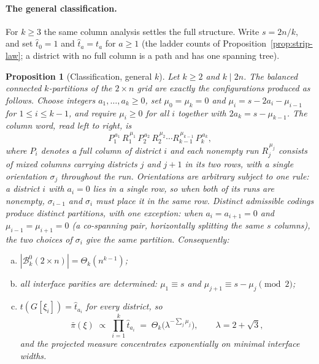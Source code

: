 \documentclass[11pt]{article}
\newcommand{\Bcal}{\mathcal{B}}
\newtheorem{proposition}[theorem]{Proposition}
\begin{document}
\paragraph{The general classification.} For $k \ge 3$ the same column
analysis settles the full structure. Write $s = 2n/k$, and set
$\hat t_0 = 1$ and $\hat t_a = t_a$ for $a \ge 1$ (the ladder counts of
Proposition~\ref{prop:strip-law}; a district with no full column is a
path and has one spanning tree).

\begin{proposition}[Classification, general $k$]
\label{prop:strip-classify-k}
Let $k \ge 2$ and $k \mid 2n$. The balanced connected $k$-partitions of
the $2 \times n$ grid are exactly the configurations produced as follows.
Choose integers $a_1, \ldots, a_k \ge 0$, set $\mu_0 = \mu_k = 0$ and
$\mu_i = s - 2a_i - \mu_{i-1}$ for $1 \le i \le k-1$, and require
$\mu_i \ge 0$ for all $i$ together with $2a_k = s - \mu_{k-1}$. The
column word, read left to right, is
\[
  P_1^{\,a_1}\, R_1^{\,\mu_1}\, P_2^{\,a_2}\, R_2^{\,\mu_2} \cdots
  R_{k-1}^{\,\mu_{k-1}}\, P_k^{\,a_k},
\]
where $P_i$ denotes a full column of district $i$ and each nonempty run
$R_j^{\,\mu_j}$ consists of mixed columns carrying districts $j$ and
$j+1$ in its two rows, with a single orientation $\sigma_j$ throughout
the run. Orientations are arbitrary subject to one rule: a district $i$
with $a_i = 0$ lies in a single row, so when both of its runs are
nonempty, $\sigma_{i-1}$ and $\sigma_i$ must place it in the same row.
Distinct admissible codings produce distinct partitions, with one
exception: when $a_i = a_{i+1} = 0$ and $\mu_{i-1} = \mu_{i+1} = 0$ (a
\emph{co-spanning pair}, horizontally splitting the same $s$ columns),
the two choices of $\sigma_i$ give the same partition. Consequently:
\begin{enumerate}[(a)]
  \item $|\Bcal_k^0(2 \times n)| = \Theta_k(n^{k-1})$;
  \item all interface parities are determined: $\mu_1 \equiv s$ and
    $\mu_{j+1} \equiv s - \mu_j \pmod 2$;
  \item $t(G[\xi_i]) = \hat t_{a_i}$ for every district, so
    \[
      \bar\pi(\xi) \;\propto\; \prod_{i=1}^{k} \hat t_{a_i}
      \;=\; \Theta_k\bigl(\lambda^{-\sum_j \mu_j}\bigr),
      \qquad \lambda = 2 + \sqrt3,
    \]
    and the projected measure concentrates exponentially on minimal
    interface widths.
\end{enumerate}
\end{proposition}
\end{document}
